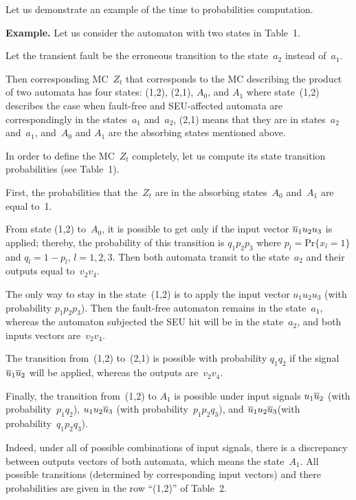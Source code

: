\begin{multicols}{2}
Let us demonstrate an example of the time to probabilities
computation.

\medskip

\noindent
\textbf{Example.}
Let us consider the automaton with two states in Table~1.

Let the transient fault be the erroneous transition to the
state~$a_2$ instead of~$a_1$.

Then corresponding MC~$Z_t$ that corresponds
to the MC describing the product of two automata has
four states: (1,2), (2,1), $A_0$, and $A_1$ where  state~(1,2)
describes the case when fault-free and SEU-affected
automata are correspondingly in the states~$a_1$ and~$a_2$,
(2,1)  means that they  are in states~$a_2$ and~$a_1$, and~$A_0$ and
$A_1$ are the  absorbing states mentioned above.
\columnbreak

In order to define the MC~$Z_t$ completely,
let us compute its state transition probabilities
(see Table~1).


First, the probabilities that the~$Z_t$ are in the
absorbing states~$A_0$ and~$A_1$ are equal to~1.

From state (1,2) to~$A_0$, it is possible to get only
if the input vector $\overline u_1u_2u_3$ is applied;
thereby, the probability of this transition is
$q_1p_2p_3$
where $p_l=\mathrm{Pr}\{x_l =1\}$ and $q_l=1-p_l$,
$l=1,2,3$.
Then both automata transit to the state~$a_2$ and
their outputs equal to~$v_2v_4$.

The only way to stay in the state~(1,2) is to apply
the input vector $u_1u_2u_3$ (with probability
$p_1p_2p_3$).
Then the fault-free automaton remains in the state~$a_1$,
whereas the automaton subjected the SEU hit will be
in the state~$a_2$, and both inputs vectors are~$v_2v_4$.

The transition from~(1,2) to~(2,1) is possible with
probability $q_1q_2$ if the signal $\overline u_1\overline u_2$ will
be applied, whereas the outputs are~$v_2v_4$.

Finally, the transition from~(1,2) to $A_1$ is possible
under input signals $u_1\overline u_2$ (with probability~$p_1q_2$),
$u_1u_2\overline u_3$ (with probability~$p_1p_2q_3$), and
$\overline u_1u_2\overline u_3$(with probability~$q_1p_2q_3$).

Indeed, under all of possible combinations of input
signals, there is a discrepancy between outputs vectors
of both automata, which means the state~$A_1$.
All possible transitions (determined by corresponding
input vectors) and there probabilities are given in
the row ``(1,2)'' of Table~2.

\bigskip


\end{multicols}
